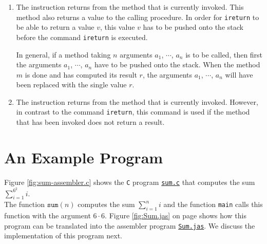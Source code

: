 \begin{enumerate}
      Before the command \texttt{invokestatic} is executed, we have to put the arguments of the method
      onto the stack.  For example, if we want to invoke the method \texttt{sum} described  above, then we
      have to push an integer $n$ onto the stack.  After the method returns, this integer is replaced with the
      return value $\mathtt{sum}(n)$.
\item The instruction 
      returns from the method that is currently invoked.  This method also returns a value to the calling
      procedure.  In order for \texttt{ireturn} to be able to return a value $v$, this value $v$ has to be
      pushed onto the stack before the command \texttt{ireturn} is executed.

      In general, if a method taking $n$ arguments $a_1$, $\cdots$, $a_n$ is to be called, then first the
      arguments $a_1$, $\cdots$, $a_n$ have to be pushed onto the stack.  When the method $m$ is done and
      has computed its result $r$, the arguments $a_1$, $\cdots$, $a_n$ will have been replaced with the
      single value $r$.
\item The instruction 
      returns from the method that is currently invoked.  However, in contrast to the command
      \texttt{ireturn}, this command is used if the method that has been invoked  does not return a result. 
\end{enumerate}

\section{An Example Program}
Figure \ref{fig:sum-assembler.c} shows the \texttt{C} program 
\href{https://github.com/karlstroetmann/Formal-Languages/tree/master/Python/Chapter-12/sum.c}{\texttt{sum.c}}
that computes the sum
\\[0.2cm]
\hspace*{1.3cm}
$\sum\limits_{i=1}^{6^2} i$.
\\[0.2cm]
The function $\mathtt{sum}(n)$ computes the sum $\sum_{i=1}^{n} i$ and the function
\texttt{main} calls this function with the argument $6 \cdot 6$.  Figure \ref{fig:Sum.jas} on page
\pageref{fig:Sum.jas} shows how this program can be translated 
into the assembler program 
\href{https://github.com/karlstroetmann/Formal-Languages/tree/master/Python/Chapter-12/Sum.jas}{\texttt{Sum.jas}}.
We discuss the implementation of this program next. 


